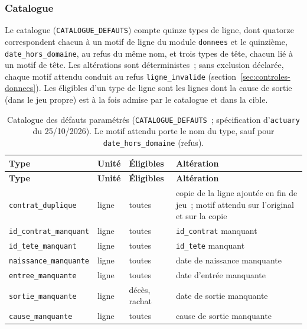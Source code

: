 \documentclass[a4paper,11pt]{article}
\newcommand{\code}[1]{\texttt{\small #1}}
\begin{document}
\subsubsection*{Catalogue}

Le catalogue (\code{CATALOGUE\_DEFAUTS}) compte quinze types de ligne, dont
quatorze correspondent chacun à un motif de ligne du module \code{donnees}
et le quinzième, \code{date\_hors\_domaine}, au refus du même nom, et trois
types de tête, chacun lié à un motif de tête. Les altérations sont
déterministes~; sans exclusion déclarée, chaque motif attendu conduit au
refus \code{ligne\_invalide} (section~\ref{sec:controles-donnees}). Les
éligibles d'un type de ligne sont les lignes dont la cause de sortie (dans
le jeu propre) est à la fois admise par le catalogue et dans la cible.

{\footnotesize
{}
\begin{longtable}{@{}p{4.9cm}p{0.9cm}p{2.5cm}p{5.9cm}@{}}
\caption{Catalogue des défauts paramétrés (\code{CATALOGUE\_DEFAUTS}~;
spécification d'\code{actuary} du 25/10/2026). Le motif attendu porte le
nom du type, sauf pour \code{date\_hors\_domaine} (refus).}
\label{tab:catalogue-defauts}\\
\rowcolor{tableheader}
\textcolor{financeblue}{\textbf{Type}} &
\textcolor{financeblue}{\textbf{Unité}} &
\textcolor{financeblue}{\textbf{Éligibles}} &
\textcolor{financeblue}{\textbf{Altération}} \\
\endfirsthead
\rowcolor{tableheader}
\textcolor{financeblue}{\textbf{Type}} &
\textcolor{financeblue}{\textbf{Unité}} &
\textcolor{financeblue}{\textbf{Éligibles}} &
\textcolor{financeblue}{\textbf{Altération}} \\
\endhead
\code{contrat\_duplique} & ligne & toutes & copie de la ligne ajoutée en fin de jeu~; motif attendu sur l'original et sur la copie \\
\code{id\_contrat\_manquant} & ligne & toutes & \code{id\_contrat} manquant \\
\code{id\_tete\_manquant} & ligne & toutes & \code{id\_tete} manquant \\
\code{naissance\_manquante} & ligne & toutes & date de naissance manquante \\
\code{entree\_manquante} & ligne & toutes & date d'entrée manquante \\
\code{sortie\_manquante} & ligne & décès, rachat & date de sortie manquante \\
\code{cause\_manquante} & ligne & toutes & cause de sortie manquante \\

\end{longtable}}
\end{document}
